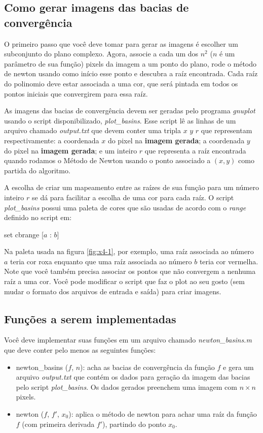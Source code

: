 \documentclass[12pt]{article}
\begin{document}
\subsection{Como gerar imagens das bacias de convergência}
O primeiro passo que você deve tomar para gerar as imagens é escolher
um subconjunto do plano complexo. Agora, associe a cada um dos $n^2$
($n$ é um parâmetro de sua função) pixels da imagem a um ponto do 
plano, rode o método de newton usando como início esse ponto e
descubra a raíz encontrada. Cada raíz do polinomio deve estar associada
a uma cor, que será pintada em todos os pontos iniciais que convergirem
para essa raíz.

As imagens das bacias de convergência devem ser geradas pelo programa
{\em gnuplot} usando o script disponibilizado, {\em plot\_basins}. Esse
script lê as linhas de um arquivo chamado {\em output.txt} que devem
conter uma tripla $x$ $y$ $r$ que representam respectivamente: a 
coordenada $x$ do pixel na \textbf{imagem gerada}; a coordenada $y$ do
pixel na \textbf{imagem gerada}; e um inteiro $r$ que representa a raíz
encontrada quando rodamos o Método de Newton usando o ponto associado a
$(x, y)$ como partida do algoritmo.

A escolha de criar um mapeamento entre as raízes de sua função para um
número inteiro $r$ se dá para facilitar a escolha de uma cor para cada
raíz. O script {\em plot\_basins} possui uma paleta de cores que
são usadas de acordo com o {\em range} definido no script em:
\begin{center}
    set cbrange [$a$ : $b$]
\end{center}
Na paleta usada na figura \ref{fig:x4-1}, por exemplo, uma raíz 
associada ao número $a$ teria cor roxa enquanto que uma raíz associada
ao número $b$ teria cor vermelha. Note que você também precisa associar
os pontos que não convergem a nenhuma raíz a uma cor. Você pode 
modificar o script que faz o plot ao seu gosto (sem mudar o formato dos
arquivos de entrada e saída) para criar imagens.


\subsection{Funções a serem implementadas}
Você deve implementar suas funções em um arquivo chamado 
{\em newton\_basins.m} que deve conter pelo menos as seguintes funções:
\begin{itemize}
    \item{newton\_basins ($f$, $n$):} acha as bacias de convergência da 
        função $f$ e gera um arquivo {\em output.txt} que contém os dados
        para geração da imagem das bacias pelo script {\em plot\_basins}.
        Os dados gerados preenchem uma imagem com $n \times n$ pixels.
    \item{newton ($f$, $f'$, $x_0$):} aplica o método de newton para 
        achar uma raíz da função $f$ (com primeira derivada $f'$), 
        partindo do ponto $x_0$.
\end{itemize}
\end{document}
